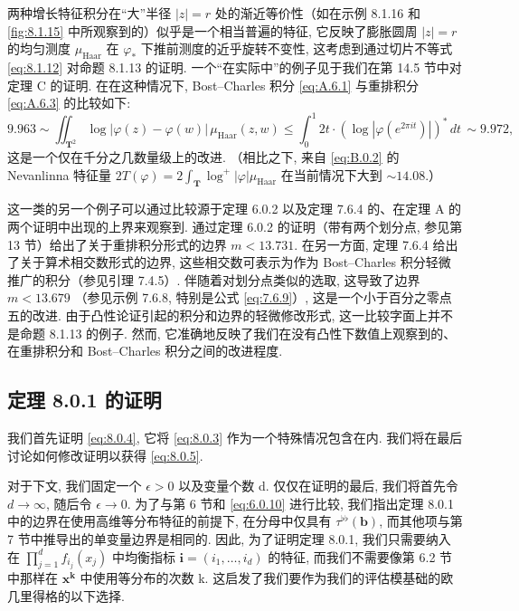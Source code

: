 \begin{remark}\label{rem:8.1.17}
两种增长特征积分在“大”半径 \(|z| = r\) 处的渐近等价性（如在示例 8.1.16 和\autoref{fig:8.1.15} 中所观察到的）似乎是一个相当普遍的特征, 
它反映了膨胀圆周 \(|z| = r\) 的均匀测度 \(\mu_{\text{Haar}}\) 在 \(\varphi_*\) 下推前测度的近乎旋转不变性, 
这考虑到通过切片不等式 \eqref{eq:8.1.12} 对命题 8.1.13 的证明. 
一个“在实际中”的例子见于我们在第 14.5 节中对定理 C 的证明. 
在在这种情况下, Bost--Charles 积分 \eqref{eq:A.6.1} 与重排积分 \eqref{eq:A.6.3} 的比较如下:
\[ 9.963 \sim \iint_{\mathbf{T}^2} \log |\varphi(z) - \varphi(w)| \, \mu_{\text{Haar}}(z, w) \leq \int_0^1 2t \cdot (\log |\varphi(e^{2\pi i t})|)^* \, dt \, \sim 9.972, \]
这是一个仅在千分之几数量级上的改进.
（相比之下, 来自 \eqref{eq:B.0.2} 的 Nevanlinna 特征量 \(2T(\varphi) = 2 \int_{\mathbf{T}} \log^+ |\varphi| \mu_{\mathrm{Haar}}\) 在当前情况下大到 \(\sim 14.08\).）

这一类的另一个例子可以通过比较源于定理 6.0.2 以及定理 7.6.4 的、在定理 A 的两个证明中出现的上界来观察到. 
通过定理 6.0.2 的证明（带有两个划分点, 参见第 13 节）给出了关于重排积分形式的边界 \(m < 13.731\). 
在另一方面, 定理 7.6.4 给出了关于算术相交数形式的边界, 
这些相交数可表示为作为 Bost--Charles 积分轻微推广的积分（参见引理 7.4.5）. 
伴随着对划分点类似的选取, 这导致了边界 \(m < 13.679\) （参见示例 7.6.8, 特别是公式 \eqref{eq:7.6.9}）, 
这是一个小于百分之零点五的改进. 
由于凸性论证引起的积分和边界的轻微修改形式, 这一比较字面上并不是命题 8.1.13 的例子. 
然而, 它准确地反映了我们在没有凸性下数值上观察到的、在重排积分和 Bost--Charles 积分之间的改进程度. \end{remark}

\subsection{定理 8.0.1 的证明}\label{sec:8.2}

我们首先证明 \eqref{eq:8.0.4}, 它将 \eqref{eq:8.0.3} 作为一个特殊情况包含在内. 
我们将在最后讨论如何修改证明以获得 \eqref{eq:8.0.5}.

对于下文, 我们固定一个 \(\epsilon > 0\) 以及变量个数 d. 
仅仅在证明的最后, 我们将首先令 \(d \to \infty\), 随后令 \(\epsilon \to 0\). 
为了与第 6 节和 \eqref{eq:6.0.10} 进行比较, 
我们指出定理 8.0.1 中的边界在使用高维等分布特征的前提下, 在分母中仅具有 \(\tau^{\flat\flat}(\mathbf{b})\), 
而其他项与第 7 节中推导出的单变量边界是相同的. 
因此, 为了证明定理 8.0.1, 我们只需要纳入在 \(\prod_{j=1}^d f_{i_j}(x_j)\) 中均衡指标 \(\mathbf{i} = (i_1, \dots, i_d)\) 的特征, 
而我们不需要像第 6.2 节中那样在 \(\mathbf{x}^{\mathbf{k}}\) 中使用等分布的次数 k. 
这启发了我们要作为我们的评估模基础的欧几里得格的以下选择.

